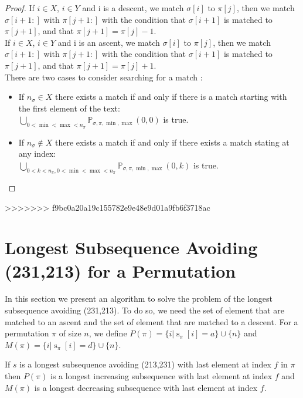 \documentclass[a4paper]{llncs}
\newcommand{\ptext}{\pi}
\newcommand{\pmotif}{\sigma}
\DeclareMathOperator{\stripea}{s}
\newcommand{\stripe}[2]{\stripea_{{#1}}[{#2}]}
\newcommand{\dstep}{d}
\newcommand{\ustep}{a}
\newcommand{\x}{X}
\newcommand{\y}{Y}
\begin{document}
\begin{proof}
If $i \in \x$, $i \in \y$ and i is a descent,
we match $\pmotif[i]$ to $\ptext[j]$,
then we match $\pmotif[i+1:]$ with $\ptext[j+1:]$
with the condition that
$\pmotif[i+1]$ is matched to $\ptext[j+1]$,
and that $\ptext[j+1]=\ptext[j]-1$.\\

If $i \in \x$, $i \in \y$ and i is an ascent,
we match $\pmotif[i]$ to $\ptext[j]$,
then we match $\pmotif[i+1:]$ with $\ptext[j+1:]$
with the condition that
$\pmotif[i+1]$ is matched to $\ptext[j+1]$,
and that $\ptext[j+1]=\ptext[j]+1$.\\

There are two cases to consider searching for a match :
\begin{itemize}
	\item If $n_\pmotif \in \x$ there exists a match if and only if there is a match starting with the first element of the text:\\ $\bigcup_{0<\min<\max<n_\ptext}\mathbb{P}_{\pmotif,\ptext,\min,\max}(0,0)$ is true.
	\item If $n_\pmotif \notin \x$ there exists a match if and only if there exists a match stating at any index: \\	$\bigcup_{0<k<n_\ptext,0<\min<\max<n_\ptext}\mathbb{P}_{\pmotif,\ptext,\min,\max}(0,k)$ is true.
\end{itemize}



\end{proof}
>>>>>>> f9bc0a20a19c155782e9e48e9d01a9fb6f3718ac



\section{Longest Subsequence Avoiding \\(231,213) for a Permutation}
\label{section:LCS}

	In this section we present an algorithm to solve the problem
	of the longest subsequence avoiding (231,213).
	To do so, we need the set of element
	that are matched to an ascent and the
	set of element that are matched to a descent.
	For a permutation $\pi$ of size $n$, we define
	$P(\pi) = \{i | \stripe{\pi}{i} = \ustep \} \cup \{n\}$ and
	$M(\pi) = \{i | \stripe{\pi}{i} = \dstep \} \cup \{n\}$.\\

	\begin{proposition}
	\label{proposition:longestIncreasingSubsequence}
	If $s$ is a longest subsequence avoiding (213,231) with last element at index $f$ in $\pi$ then
	$P(\pi)$ is a longest increasing subsequence with last element at index $f$ and
	$M(\pi)$ is a longest decreasing subsequence with last element at index $f$.
	\end{proposition}
\end{document}
